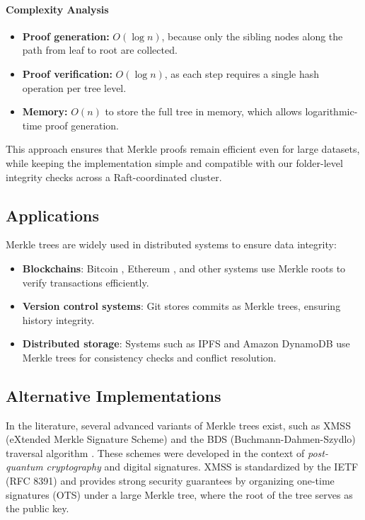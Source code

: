 \paragraph{Complexity Analysis}
\begin{itemize}
    \item \textbf{Proof generation:} $O(\log n)$, because only the sibling nodes along the path from leaf to root are collected.  
    \item \textbf{Proof verification:} $O(\log n)$, as each step requires a single hash operation per tree level.  
    \item \textbf{Memory:} $O(n)$ to store the full tree in memory, which allows logarithmic-time proof generation.
\end{itemize}

This approach ensures that Merkle proofs remain efficient even for large datasets, while keeping the implementation simple and compatible with our folder-level integrity checks across a Raft-coordinated cluster.


\subsection{Applications}

Merkle trees are widely used in distributed systems to ensure data integrity:
\begin{itemize}
    \item \textbf{Blockchains}: Bitcoin \cite{bitcoinwiki-merkle}, Ethereum \cite{ethereum-patricia}, and other systems use Merkle roots to verify transactions efficiently.
    \item \textbf{Version control systems}: Git stores commits as Merkle trees, ensuring history integrity.
    \item \textbf{Distributed storage}: Systems such as IPFS \cite{ipfs-merkle-dag} and Amazon DynamoDB \cite{decandia2007dynamo} use Merkle trees for consistency checks and conflict resolution.
\end{itemize}

\subsection{Alternative Implementations}

In the literature, several advanced variants of Merkle trees exist, such as XMSS (eXtended Merkle Signature Scheme) \cite{buchmann2011xmss} and the BDS (Buchmann-Dahmen-Szydlo) traversal algorithm \cite{buchmann2008merkle}. These schemes were developed in the context of \emph{post-quantum cryptography} and digital signatures. XMSS is standardized by the IETF (RFC 8391) and provides strong security guarantees by organizing one-time signatures (OTS) under a large Merkle tree, where the root of the tree serves as the public key.  

